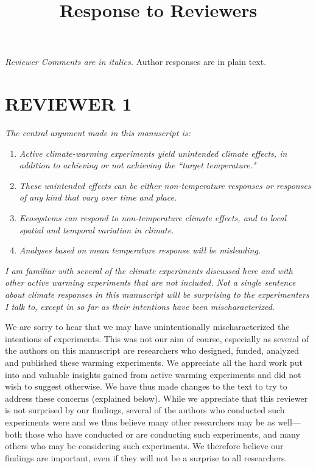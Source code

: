 \documentclass[11pt,a4paper]{letter}
\begin{document}
\begin{letter}{}
\clearpage
\title{Response to Reviewers}
 \emph{Reviewer Comments are in italics.} Author responses are in plain text.

\section {REVIEWER 1}

\emph{The central argument made in this manuscript is:}
\begin{enumerate}
\item \emph{Active climate-warming experiments yield unintended climate effects, in addition to achieving or not achieving the ``target temperature."}   
\item \emph{These unintended effects can be either non-temperature responses or responses of any kind that vary over time and place.}
\item \emph{Ecosystems can respond to non-temperature climate effects, and to local spatial and temporal variation in climate.}
\item \emph{Analyses based on mean temperature response will be misleading.}
\end{enumerate}

\emph{I am familiar with several of the climate experiments discussed here and with other active warming experiments that are not included.  Not a single sentence about climate responses in this manuscript will be surprising to the experimenters I talk to, except in so far as their intentions have been mischaracterized.}  

We are sorry to hear that we may have unintentionally mischaracterized the intentions of experiments. This was not our aim of course, especially as several of the authors on this manuscript are researchers who designed, funded, analyzed and published these warming experiments. We appreciate all the hard work put into and valuable insights gained from active warming experiments and did not wish to suggest otherwise. We have thus made changes to the text to try to address these concerns (explained below). While we appreciate that this reviewer is not surprised by our findings, several of the authors who conducted such experiments were and we thus believe many other researchers may be as well---both those who have conducted or are conducting such experiments, and many others who may be considering such experiments. We therefore believe our findings are important, even if they will not be a surprise to all researchers.


\end{letter}
\end{document}
